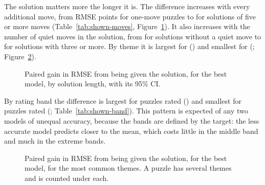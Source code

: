 \documentclass[11pt]{article}
\begin{document}
The solution matters more the longer it is. The difference increases with
every additional move, from  RMSE points for
one-move puzzles to  for solutions of five or
more moves (Table~\ref{tab:shown-moves}, Figure~\ref{fig:shown-moves}). It
also increases with the number of quiet moves in the solution, from
 for solutions without a quiet move to
 for solutions with three or more. By theme it
is largest for \texttt{}
() and smallest for
\texttt{}
(; Figure~\ref{fig:shown-themes}).

\begin{table}[htbp]\centering\small
{}
\caption{The two best models by solution length: the number of test puzzles,
the RMSE of the model without the solution (\emph{Hidden}) and of the model
with it (\emph{Shown}), and their paired difference with its 95\% CI, bold
when statistically significant.}
\label{tab:shown-moves}
\end{table}

\begin{figure}[htbp]\centering
{}
\caption{Paired gain in RMSE from being given the solution, for the best
model, by solution length, with its 95\% CI.}
\label{fig:shown-moves}
\end{figure}

By rating band the difference is largest for puzzles rated
 () and smallest
for puzzles rated 
(; Table~\ref{tab:shown-band}). This pattern
is expected of any two models of unequal accuracy, because the bands are
defined by the target: the less accurate model predicts closer to the mean,
which costs little in the middle band and much in the extreme bands.

\begin{table}[htbp]\centering\small
{}
\caption{The two best models by band of the true rating, as in
Table~\ref{tab:shown-moves}.}
\label{tab:shown-band}
\end{table}

\begin{figure}[htbp]\centering
{}
\caption{Paired gain in RMSE from being given the solution, for the best
model, for the  most common themes. A puzzle has
several themes and is counted under each.}
\label{fig:shown-themes}
\end{figure}
\end{document}
